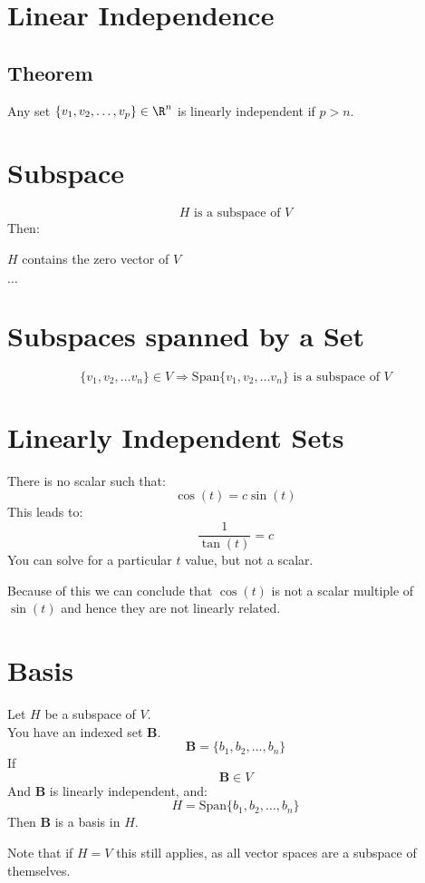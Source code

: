 \documentclass{article}
\author{Alex Hiller}
\title{}
\begin{document}
\section{Linear Independence} 
\subsection{Theorem} 
Any set $\{ v_1,v_2,\ldots,v_{p}  \} \in \R^{n} $ is linearly independent if $p>n$.

\section{Subspace}
\[
    H \text{ is a subspace of } V
\]%
Then:

$H$ contains the zero vector of $V$

$\ldots$  

\section{Subspaces spanned by a Set} 
\[
    \{ v_{1} , v_{2} , \ldots v_{n} \}  \in V \Rightarrow \text{Span} \{ v_{1} , v_{2} , \ldots v_{n} \}
    \text{ is a subspace of } V
\]%


\section{Linearly Independent Sets} 
There is no scalar such that:
\[
    \cos( t ) = c \sin( t ) 
\]%
This leads to:
\[
    \frac{1}{\tan (t) } = c
\]%
You can solve for a particular $t$  value, but not a scalar.

Because of this we can conclude that $ \cos( t )  $  is not a scalar multiple of
$ \sin( t)  $ and hence they are not linearly related.


\section{Basis} 
Let $ H $  be a subspace of $ V $. \\
You have an indexed set $ \mathbf{B} $.
\[
    \mathbf{B} = \{ b_1,b_2,\ldots,b_{n}  \} 
\]%
If 
\[
    \mathbf{B} \in V
\]%
And $ \mathbf{B} $  is linearly independent, and:
\[
    H = \text{Span} \{ b_1,b_2,\ldots,b_{n}  \} 
\]%
Then $ \mathbf{B} $  is a basis in $ H $.


Note that if $ H = V $  this still applies, as all vector spaces are a subspace
of themselves.

\clearpage
\end{document}

